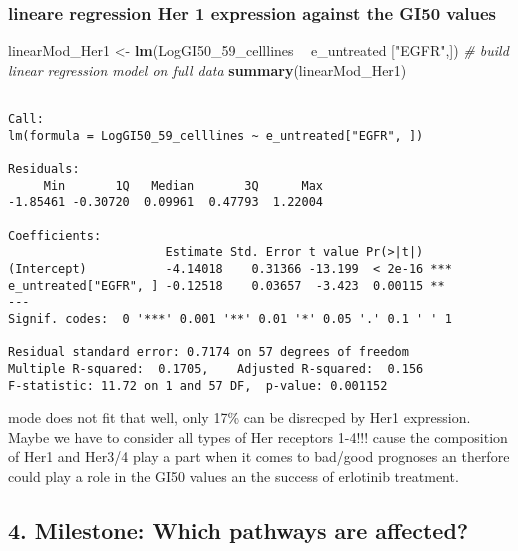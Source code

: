 \documentclass[]{article}
\newenvironment{Shaded}{\begin{snugshade}}{\end{snugshade}}
\newcommand{\CommentTok}[1]{\textcolor[rgb]{0.56,0.35,0.01}{\textit{#1}}}
\newcommand{\DecValTok}[1]{\textcolor[rgb]{0.00,0.00,0.81}{#1}}
\newcommand{\KeywordTok}[1]{\textcolor[rgb]{0.13,0.29,0.53}{\textbf{#1}}}
\newcommand{\NormalTok}[1]{#1}
\newcommand{\OperatorTok}[1]{\textcolor[rgb]{0.81,0.36,0.00}{\textbf{#1}}}
\newcommand{\StringTok}[1]{\textcolor[rgb]{0.31,0.60,0.02}{#1}}
\begin{document}
\hypertarget{lineare-regression-her-1-expression-against-the-gi50-values}{%
\subsubsection{lineare regression Her 1 expression against the GI50
values}\label{lineare-regression-her-1-expression-against-the-gi50-values}}

\begin{Shaded}
\begin{Highlighting}[]
\NormalTok{linearMod_Her1 <-}\StringTok{ }\KeywordTok{lm}\NormalTok{(LogGI50_}\DecValTok{59}\NormalTok{_celllines }\OperatorTok{~}\StringTok{ }\NormalTok{e_untreated [}\StringTok{"EGFR"}\NormalTok{,])  }\CommentTok{# build linear regression model on full data}
\KeywordTok{summary}\NormalTok{(linearMod_Her1)}
\end{Highlighting}
\end{Shaded}

\begin{verbatim}

Call:
lm(formula = LogGI50_59_celllines ~ e_untreated["EGFR", ])

Residuals:
     Min       1Q   Median       3Q      Max 
-1.85461 -0.30720  0.09961  0.47793  1.22004 

Coefficients:
                      Estimate Std. Error t value Pr(>|t|)    
(Intercept)           -4.14018    0.31366 -13.199  < 2e-16 ***
e_untreated["EGFR", ] -0.12518    0.03657  -3.423  0.00115 ** 
---
Signif. codes:  0 '***' 0.001 '**' 0.01 '*' 0.05 '.' 0.1 ' ' 1

Residual standard error: 0.7174 on 57 degrees of freedom
Multiple R-squared:  0.1705,    Adjusted R-squared:  0.156 
F-statistic: 11.72 on 1 and 57 DF,  p-value: 0.001152
\end{verbatim}

mode does not fit that well, only 17\% can be disrecped by Her1
expression. Maybe we have to consider all types of Her receptors 1-4!!!
cause the composition of Her1 and Her3/4 play a part when it comes to
bad/good prognoses an therfore could play a role in the GI50 values an
the success of erlotinib treatment.

\hypertarget{milestone-which-pathways-are-affected}{%
\subsection{4. Milestone: Which pathways are
affected?}\label{milestone-which-pathways-are-affected}}
\end{document}
